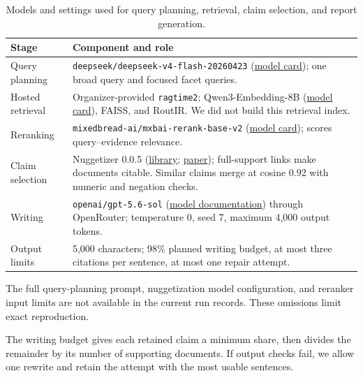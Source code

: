 \documentclass[11pt,letterpaper]{article}
\begin{document}
\begin{table}[!ht]
\small
\begin{tabularx}{\linewidth}{@{}lX@{}}
\toprule
Stage & Component and role\\\midrule
Query planning & \texttt{deepseek/deepseek-v4-flash-20260423} (\href{https://huggingface.co/deepseek-ai/DeepSeek-V4-Flash}{\textcolor{sea}{model card}}); one broad query and focused facet queries.\\
Hosted retrieval & Organizer-provided \texttt{ragtime2}; Qwen3-Embedding-8B (\href{https://huggingface.co/Qwen/Qwen3-Embedding-8B}{\textcolor{sea}{model card}}), FAISS, and RoutIR. We did not build this retrieval index.\\
Reranking & \texttt{mixedbread-ai/mxbai-rerank-base-v2} (\href{https://huggingface.co/mixedbread-ai/mxbai-rerank-base-v2}{\textcolor{sea}{model card}}); scores query--evidence relevance.\\
Claim selection & Nuggetizer 0.0.5 (\href{https://github.com/castorini/nuggetizer}{\textcolor{sea}{library}}; \href{https://doi.org/10.1145/3726302.3730090}{\textcolor{sea}{paper}}); full-support links make documents citable. Similar claims merge at cosine 0.92 with numeric and negation checks.\\
Writing & \texttt{openai/gpt-5.6-sol} (\href{https://developers.openai.com/api/docs/models/gpt-5.6-sol}{\textcolor{sea}{model documentation}}) through OpenRouter; temperature 0, seed 7, maximum 4,000 output tokens.\\
Output limits & 5,000 characters; 98\% planned writing budget, at most three citations per sentence, at most one repair attempt.\\\bottomrule
\end{tabularx}
\caption{Models and settings used for query planning, retrieval, claim selection, and report generation.}
\label{tab:models}
\end{table}

The full query-planning prompt, nuggetization model configuration, and reranker input limits are not available in the current run records. These omissions limit exact reproduction.

The writing budget gives each retained claim a minimum share, then divides the remainder by its number of supporting documents. If output checks fail, we allow one rewrite and retain the attempt with the most usable sentences.
\end{document}
